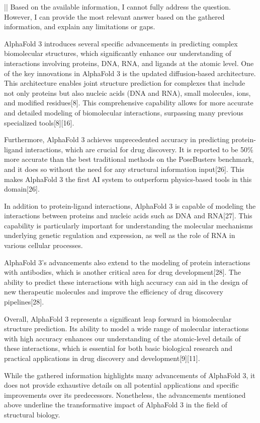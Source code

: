 \begin{showcase}[title=Topic: AlphaFold 3]
||
Based on the available information, I cannot fully address the question. However, I can provide the most relevant answer based on the gathered information, and explain any limitations or gaps.

AlphaFold 3 introduces several specific advancements in predicting complex biomolecular structures, which significantly enhance our understanding of interactions involving proteins, DNA, RNA, and ligands at the atomic level. One of the key innovations in AlphaFold 3 is the updated diffusion-based architecture. This architecture enables joint structure prediction for complexes that include not only proteins but also nucleic acids (DNA and RNA), small molecules, ions, and modified residues[8]. This comprehensive capability allows for more accurate and detailed modeling of biomolecular interactions, surpassing many previous specialized tools[8][16].

Furthermore, AlphaFold 3 achieves unprecedented accuracy in predicting protein-ligand interactions, which are crucial for drug discovery. It is reported to be 50\% more accurate than the best traditional methods on the PoseBusters benchmark, and it does so without the need for any structural information input[26]. This makes AlphaFold 3 the first AI system to outperform physics-based tools in this domain[26].

In addition to protein-ligand interactions, AlphaFold 3 is capable of modeling the interactions between proteins and nucleic acids such as DNA and RNA[27]. This capability is particularly important for understanding the molecular mechanisms underlying genetic regulation and expression, as well as the role of RNA in various cellular processes.

AlphaFold 3's advancements also extend to the modeling of protein interactions with antibodies, which is another critical area for drug development[28]. The ability to predict these interactions with high accuracy can aid in the design of new therapeutic molecules and improve the efficiency of drug discovery pipelines[28].

Overall, AlphaFold 3 represents a significant leap forward in biomolecular structure prediction. Its ability to model a wide range of molecular interactions with high accuracy enhances our understanding of the atomic-level details of these interactions, which is essential for both basic biological research and practical applications in drug discovery and development[9][11].

While the gathered information highlights many advancements of AlphaFold 3, it does not provide exhaustive details on all potential applications and specific improvements over its predecessors. Nonetheless, the advancements mentioned above underline the transformative impact of AlphaFold 3 in the field of structural biology.


\end{showcase}
